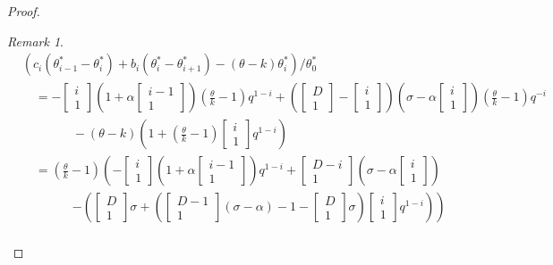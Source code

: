 \documentclass[
]{book}
\theoremstyle{definition}
\theoremstyle{definition}
\theoremstyle{definition}
\theoremstyle{definition}
\theoremstyle{remark}
\newtheorem*{remark}{Remark}
\begin{document}
\begin{proof}
\begin{remark}
\begin{align}
& (c_i(\theta^*_{i-1}-\theta^*_i) + b_i(\theta^*_i -\theta^*_{i+1}) - (\theta-k) \theta^*_i)/\theta^*_0\\
& \quad = -\begin{bmatrix}{i}\\{1}\end{bmatrix}\left(1+\alpha \begin{bmatrix}{i-1}\\{1}\end{bmatrix}\right)\left(\frac{\theta}{k}-1\right)q^{1-i} + \left(\begin{bmatrix}{D}\\{1}\end{bmatrix}-\begin{bmatrix}{i}\\{1}\end{bmatrix}\right)\left(\sigma- \alpha \begin{bmatrix}{i}\\{1}\end{bmatrix}\right)\left(\frac{\theta}{k}-1\right)q^{-i}\\
& \qquad\qquad -(\theta-k)\left(1+\left(\frac{\theta}{k}-1\right)\begin{bmatrix}{i}\\{1}\end{bmatrix}q^{1-i}\right)\\
& \quad = \left(\frac{\theta}{k}-1\right)\left(-\begin{bmatrix}{i}\\{1}\end{bmatrix}\left(1+
\alpha\begin{bmatrix}{i-1}\\{1}\end{bmatrix}\right)q^{1-i}+\begin{bmatrix}{D-i}\\{1}\end{bmatrix}\left(\sigma-\alpha \begin{bmatrix}{i}\\{1}\end{bmatrix}\right)\right.\\
& \qquad\qquad\left.-\left(\begin{bmatrix}{D}\\{1}\end{bmatrix}\sigma +  \left(\begin{bmatrix}{D-1}\\{1}\end{bmatrix}(\sigma-\alpha)-1-\begin{bmatrix}{D}\\{1}\end{bmatrix}\sigma\right)\begin{bmatrix}{i}\\{1}\end{bmatrix}q^{1-i}\right)\right)\\

\end{align}
\end{remark}
\end{proof}
\end{document}
